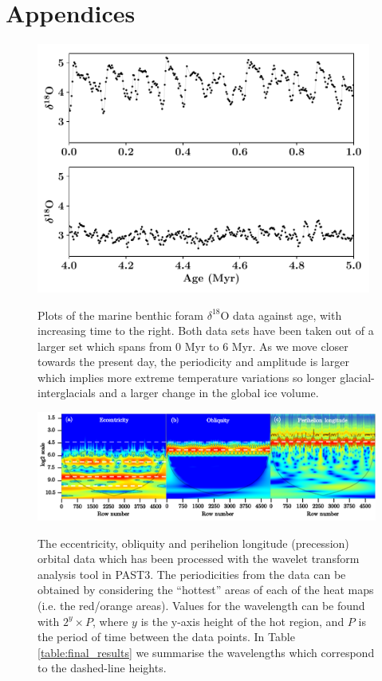 \documentclass[12pt, onecolumn]{revtex4}    %
\begin{document}
\newpage

\section*{Appendices}
\begin{figure}[!h]
\begin{center}
\includegraphics[width=11cm]{figures/foram_data}
\caption[]{Plots of the marine benthic foram $\delta^{18}$O data against age, with increasing time to the right. Both data sets have been taken out of a larger set which spans from 0 Myr to 6 Myr. As we move closer towards the present day, the periodicity and amplitude is larger which implies more extreme temperature variations so longer glacial-interglacials and a larger change in the global ice volume.}
\vspace{-3ex}
\label{fig:foram_data}
\end{center}
\end{figure}

\begin{figure}[!h]
\begin{center}
\includegraphics[width=16cm]{figures/wa_orbital_data}
\caption[]{The eccentricity, obliquity and perihelion longitude (precession) orbital data which has been processed with the wavelet transform analysis tool in PAST3. The periodicities from the data can be obtained by considering the ``hottest'' areas of each of the heat maps (i.e. the red/orange areas). Values for the wavelength can be found with $2^y \times P$, where $y$ is the y-axis height of the hot region, and $P$ is the period of time between the data points. In Table \ref{table:final_results} we summarise the wavelengths which correspond to the dashed-line heights.}
\vspace{-3ex}
\label{fig:wa_orbital_data}
\end{center}
\end{figure}
\end{document}
